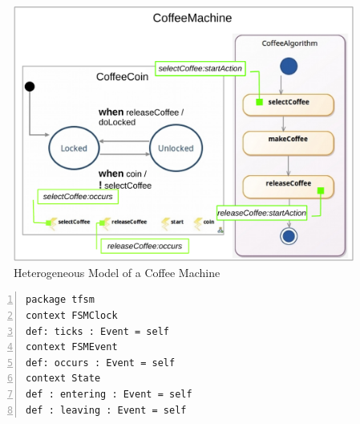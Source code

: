 \begin{figure}
	\center
	\includegraphics[width=.5\columnwidth]{bcool/figs/models.pdf}
	\caption{Heterogeneous Model of a Coffee Machine}
	\label{fig:runningexample}
\end{figure}

\begin{lstlisting}[language=ecl,
caption={Partial \ecl specification of TFSM},
label={fig:tfsmmmecl}, 
basicstyle=\scriptsize\ttfamily, backgroundcolor=\color{LGrey}, numbers=left, xleftmargin=3pt]
package tfsm
context FSMClock
def: ticks : Event = self
context FSMEvent
def: occurs : Event = self
context State
def : entering : Event = self
def : leaving : Event = self
\end{lstlisting}


